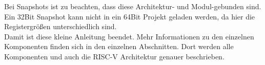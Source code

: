 Bei Snapshots ist zu beachten, dass diese Architektur- und Modul-gebunden sind.
Ein 32Bit Snapshot kann nicht in ein 64Bit Projekt geladen werden, da hier die
Registergrößen unterschiedlich sind.\\

Damit ist diese kleine Anleitung beendet. Mehr Informationen zu den einzelnen
Komponenten finden sich in den einzelnen Abschnitten. Dort werden alle
Komponenten und auch die RISC-V Architektur genauer beschrieben.
